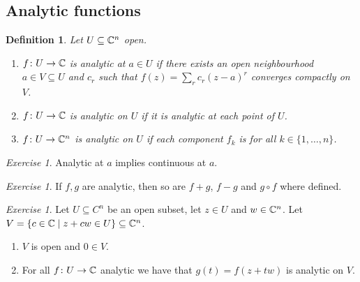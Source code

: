 \documentclass[A4paper, british, reqno]{amsart}
\theoremstyle{darkgreentheorem}
\theoremstyle{darkbluedefinition}
\newtheorem{defn}[thm]{Definition}
\theoremstyle{darkredexample}
\theoremstyle{remark}
\newtheorem{exe}[thm]{Exercise}
\newcommand{\1}{\mathbbm{1}}
\begin{document}
\subsection{Analytic functions}

\begin{defn}
    Let $U\subseteq \mathbb{C}^{n}$ open.
    \begin{enumerate}[label=\roman*)]
	\item $f\colon U\to \mathbb{C}$ is \textit{analytic} at $a\in U$ if there exists an open neighbourhood $a\in V\subseteq U$ and $c_{r}$ such that $f(z)=\sum_{r}c_{r}(z-a)^{r}$ converges compactly on $V$.
	\item $f\colon U\to \mathbb{C}$ is \textit{analytic} on $U$ if it is analytic at each point of $U$.
	\item $f\colon U\to \mathbb{C}^{n}$ is \textit{analytic} on $U$ if each component $f_{k}$ is for all $k\in \{1,\ldots, n\}$.
    \end{enumerate}
\end{defn}

\begin{exe}
    Analytic at $a$ implies continuous at $a$.
\end{exe}

\begin{exe}
    If $f,g$ are analytic, then so are $f+g$, $f-g$ and $g\circ f$ where defined.
\end{exe}

\begin{exe}
    Let $U\subseteq C^{n}$ be an open subset, let $z\in U$ and $w\in \mathbb{C}^{n}$.
    Let $V=\{c\in \mathbb{C}\mid z+cw\in U\}\subseteq \mathbb{C}^{n}$.
    \begin{enumerate}[label=\roman*)]
	\item $V$ is open and $0\in V$.
	\item For all $f\colon U\to \mathbb{C}$ analytic we have that $g(t)=f(z+tw)$ is analytic on $V$.
    \end{enumerate}
\end{exe}
\end{document}
